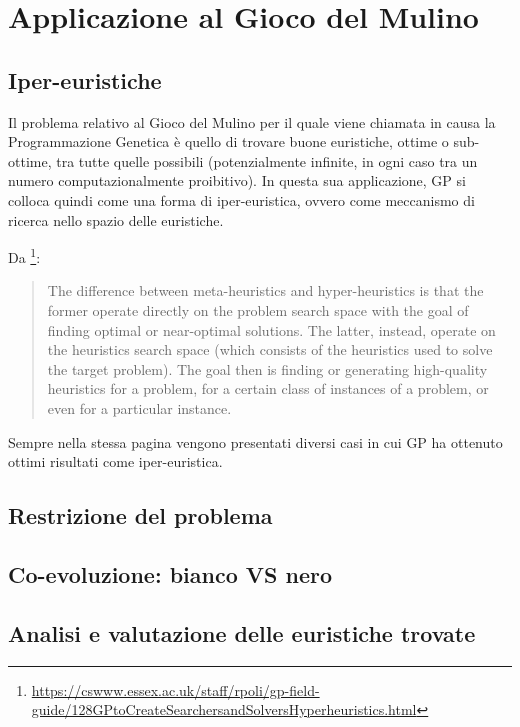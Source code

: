 \documentclass{../llncs}
\begin{document}
\section{Applicazione al Gioco del Mulino}
\subsection{Iper-euristiche}
Il problema relativo al Gioco del Mulino per il quale viene chiamata in causa la Programmazione Genetica è quello di trovare buone euristiche, ottime o sub-ottime, tra tutte quelle possibili (potenzialmente infinite, in ogni caso tra un numero computazionalmente proibitivo). In questa sua applicazione, GP si colloca quindi come una forma di iper-euristica, ovvero come meccanismo di ricerca nello spazio delle euristiche.

Da \footnote{\url{https://cswww.essex.ac.uk/staff/rpoli/gp-field-guide/128GPtoCreateSearchersandSolversHyperheuristics.html}}:
\begin{quote}
The difference between meta-heuristics and hyper-heuristics is that the former operate directly on the problem search space with the goal of finding optimal or near-optimal solutions. The latter, instead, operate on the heuristics search space (which consists of the heuristics used to solve the target problem). The goal then is finding or generating high-quality heuristics for a problem, for a certain class of instances of a problem, or even for a particular instance.
\end{quote}
Sempre nella stessa pagina vengono presentati diversi casi in cui GP ha ottenuto ottimi risultati come iper-euristica.

\subsection{Restrizione del problema}
\subsection{Co-evoluzione: bianco VS nero}
\subsection{Analisi e valutazione delle euristiche trovate}
\end{document}
